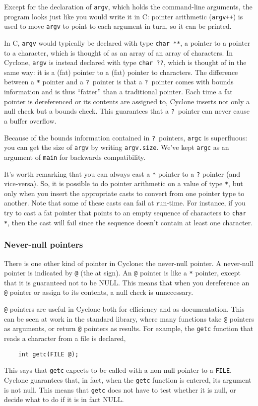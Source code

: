 Except for the declaration of \texttt{argv}, which holds the
command-line arguments, the program looks just like you would write it
in C: pointer arithmetic (\texttt{argv++}) is used to move
\texttt{argv} to point to each argument in turn, so it can be printed.

In C, \texttt{argv} would typically be declared with type \texttt{char
  **}, a pointer to a pointer to a character, which is thought of as
an array of an array of characters.  In Cyclone, \texttt{argv} is
instead declared with type \texttt{char ??}, which is thought of in
the same way: it is a (fat) pointer to a (fat) pointer to characters.  The
difference between a \texttt{*} pointer and a \texttt{?}\ pointer is
that a \texttt{?}\ pointer comes with bounds information and is thus
``fatter'' than a traditional pointer.  Each time a
fat pointer is dereferenced or its contents are assigned to,
Cyclone inserts not only a null check but a bounds check.  This
guarantees that a \texttt{?}\ pointer can never cause a buffer
overflow.

Because of the bounds information contained in \texttt{?}\ pointers,
\texttt{argc} is superfluous: you can get the size of \texttt{argv} by
writing \texttt{argv.size}.  We've kept \texttt{argc} as an argument
of \texttt{main} for backwards compatibility.

It's worth remarking that you can always cast a \texttt{*} pointer
to a \texttt{?} pointer (and vice-versa).  So, it is possible to do
pointer arithmetic on a value of type \texttt{*}, but only when you
insert the appropriate casts to convert from one pointer type to 
another.  Note that some of these casts can fail at run-time.  For
instance, if you try to cast a fat pointer that points to an empty 
sequence of characters to \texttt{char *}, then the cast will fail
since the sequence doesn't contain at least one character.  

\subsubsection*{Never-null pointers}

There is one other kind of pointer in Cyclone: the never-null pointer.
A never-null pointer is indicated by \texttt{@} (the at sign).  An
\texttt{@} pointer is like a \texttt{*} pointer, except that it is
guaranteed not to be NULL\@.  This means that when you dereference an
\texttt{@} pointer or assign to its contents, a null check is
unnecessary.

\texttt{@} pointers are useful in Cyclone both for efficiency and as
documentation.  This can be seen at work in the standard library,
where many functions take \texttt{@} pointers as arguments, or return
\texttt{@} pointers as results.  For example, the \texttt{getc}
function that reads a character from a file is declared,
\begin{verbatim}
    int getc(FILE @);
\end{verbatim}
This says that \texttt{getc} expects to be called with a non-null
pointer to a \texttt{FILE}\@.  Cyclone guarantees that, in fact, when
the \texttt{getc} function is entered, its argument is not null.  This
means that \texttt{getc} does not have to test whether it is null, or
decide what to do if it is in fact NULL\@.

